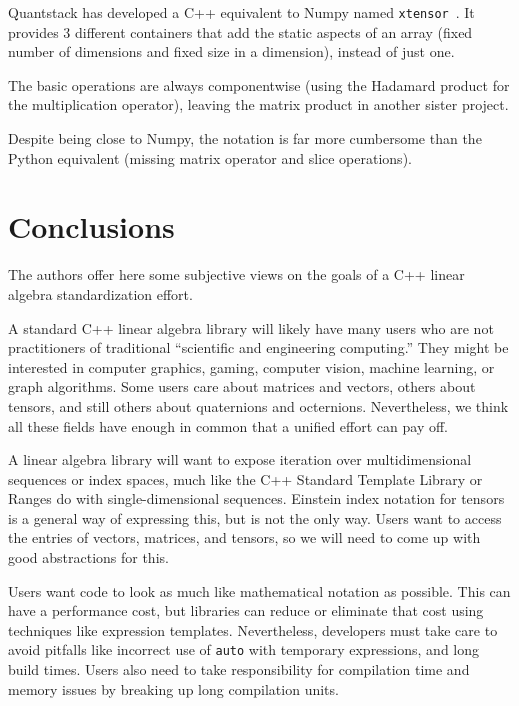 Quantstack has developed a C++ equivalent to Numpy named
\texttt{xtensor}~\cite{xtensor}. It provides 3 different containers
that add the static aspects of an array (fixed number of dimensions
and fixed size in a dimension), instead of just one.

The basic operations are always componentwise (using the Hadamard
product for the multiplication operator), leaving the matrix product
in another sister project.

Despite being close to Numpy, the notation is far more cumbersome than
the Python equivalent (missing matrix operator and slice operations).

\section{Conclusions}
\label{S:conclusions}

The authors offer here some subjective views on the goals of a C++
linear algebra standardization effort.

A standard C++ linear algebra library will likely have many users who
are not practitioners of traditional ``scientific and engineering
computing.''  They might be interested in computer graphics, gaming,
computer vision, machine learning, or graph algorithms.  Some users
care about matrices and vectors, others about tensors, and still
others about quaternions and octernions.  Nevertheless, we think all
these fields have enough in common that a unified effort can pay off.

A linear algebra library will want to expose iteration over
multidimensional sequences or index spaces, much like the C++ Standard
Template Library or Ranges do with single-dimensional sequences.
Einstein index notation for tensors is a general way of expressing
this, but is not the only way.  Users want to access the entries of
vectors, matrices, and tensors, so we will need to come up with good
abstractions for this.

Users want code to look as much like mathematical notation as
possible.  This can have a performance cost, but libraries can reduce
or eliminate that cost using techniques like expression templates.
Nevertheless, developers must take care to avoid pitfalls like
incorrect use of \texttt{auto} with temporary expressions, and long
build times.  Users also need to take responsibility for compilation
time and memory issues by breaking up long compilation units.

